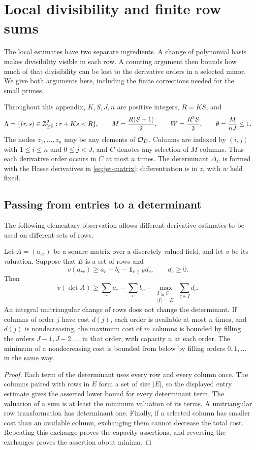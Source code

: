 \section{Local divisibility and finite row sums}\label{app:local}\label{supp:local}
The local estimates have two separate ingredients. A change of polynomial
basis makes divisibility visible in each row. A counting argument then bounds
how much of that divisibility can be lost to the derivative orders in a
selected minor. We give both arguments here, including the finite corrections
needed for the small primes.

Throughout this appendix, $K,S,J,n$ are positive integers, $R=KS$, and
\[
 \Lambda=\{(r,s)\in\mathbb Z_{\geq0}^2:r+Ks<R\},\qquad
 M=\frac{R(S+1)}2,\qquad W=\frac{R^2S}3,\qquad
 \theta=\frac{M}{nJ}\leq1.
\]
The nodes $z_1,\ldots,z_n$ may be any elements of $\mathcal O_D$. Columns are indexed
by $(i,j)$ with $1\leq i\leq n$ and $0\leq j<J$, and $C$ denotes any selection
of $M$ columns. Thus each derivative order occurs in $C$ at most $n$ times.
The determinant $\Delta_C$ is formed with the Hasse derivatives in
\eqref{eq:jet-matrix}; differentiation is in $z$, with $w$ held fixed.

\subsection{Passing from entries to a determinant}
The following elementary observation allows different derivative estimates
to be used on different sets of rows.

\begin{lemma}\label{lem:local-determinant}
Let $A=(a_{rc})$ be a square matrix over a discretely valued field, and let
$v$ be its valuation. Suppose that $E$ is a set of rows and
\[
 v(a_{rc})\geq a_r-b_c-\boldsymbol1_{r\in E}d_c,
 \qquad d_c\geq0.
\]
Then
\[
 v(\det A)\geq\sum_r a_r-\sum_c b_c
 -\max_{\substack{I\subseteq C\\|I|=|E|}}\sum_{c\in I}d_c.
\]
An integral unitriangular change of rows does not change the determinant.
If columns of order $j$ have cost $d(j)$, each order is available at most
$n$ times, and $d(j)$ is nondecreasing, the maximum cost of $m$ columns is
bounded by filling the orders $J-1,J-2,\ldots$ in that order, with capacity
$n$ at each order. The minimum of a nondecreasing cost is bounded from below
by filling orders $0,1,\ldots$ in the same way.
\end{lemma}
\begin{proof}
Each term of the determinant uses every row and every column once. The
columns paired with rows in $E$ form a set of size $|E|$, so the displayed
entry estimate gives the asserted lower bound for every determinant term.
The valuation of a sum is at least the minimum valuation of its terms.
A unitriangular row transformation has determinant one. Finally, if a
selected column has smaller cost than an available column, exchanging them
cannot decrease the total cost. Repeating this exchange proves the capacity
assertions, and reversing the exchanges proves the assertion about minima.
\end{proof}

